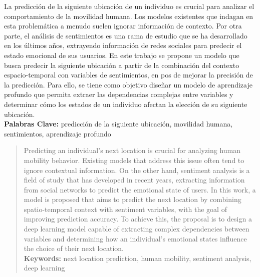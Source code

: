 \begin{resumen}
	La predicción de la siguiente ubicación de un individuo 
	es crucial para 
	analizar el comportamiento de la movilidad humana. 
	Los modelos existentes que indagan en esta problemática a 
	menudo suelen ignorar información de contexto. Por otra parte, 
	el análisis de sentimientos es una rama de estudio que se 
	ha desarrollado en los últimos años, extrayendo información 
	de redes sociales para predecir el estado emocional de sus usuarios.
	En este trabajo se propone un modelo que busca predecir la 
	siguiente ubicación a partir de la combinación del contexto 
	espacio-temporal con variables de sentimientos, en pos de mejorar 
	la precisión de la predicción. Para ello, se tiene como objetivo diseñar un 
	modelo de aprendizaje profundo que permita extraer las 
	dependencias complejas entre variables y determinar cómo los 
	estados de un individuo afectan la elección de su siguiente ubicación.\\

	\textbf{Palabras Clave:}
	predicci\'on de la siguiente ubicación, movilidad humana, sentimientos, aprendizaje profundo 
\end{resumen}
	
\begin{abstract}
	Predicting an individual's next location is crucial for analyzing 
	human mobility behavior. Existing models that address this issue often 
	tend to ignore contextual information. On the other hand, sentiment 
	analysis is a field of study that has developed in recent years, 
	extracting information from social networks to predict the emotional 
	state of users. In this work, a model is proposed that aims to 
	predict the next location by combining spatio-temporal context with 
	sentiment variables, with the goal of improving prediction accuracy.
	To achieve this, the proposal is to design a deep learning model 
	capable of extracting complex dependencies between variables and 
	determining how an individual's emotional states influence the 
	choice of their next location.\\

	\textbf{Keywords:}
	next location prediction, human mobility, sentiment analysis, deep learning
\end{abstract}